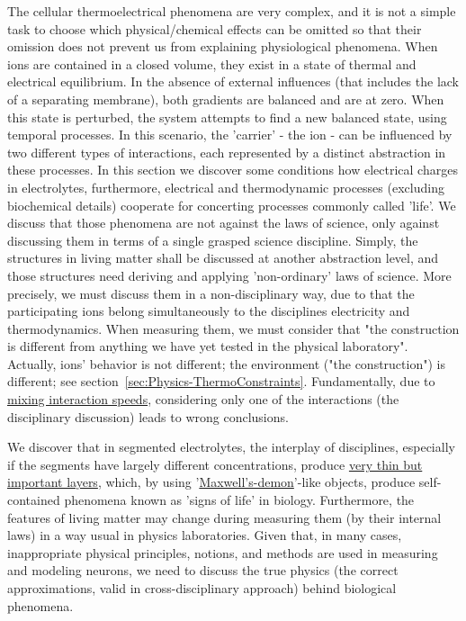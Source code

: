 	
The cellular thermoelectrical phenomena are very complex, and it is
not a simple task to choose which physical/chemical effects can be
omitted so that their omission does not prevent us from explaining
physiological phenomena. 
When ions are contained in a closed volume,
they exist in a state of thermal and electrical equilibrium.
In the absence of external influences (that includes the lack of a separating membrane),
both gradients are balanced and are at zero.
When this state is perturbed, the system attempts to find a 
new balanced state, using temporal processes.
In this scenario, the 'carrier' - the ion - can be influenced by two different types of interactions, each represented by a distinct abstraction in these processes.
In this section we  discover some conditions how electrical charges in electrolytes, furthermore, electrical and thermodynamic processes (excluding biochemical details)
cooperate for concerting processes commonly called 'life'.
We discuss that those phenomena are not against the laws of science, only against discussing them in terms of a single grasped science discipline. 
Simply, the structures in living matter shall be 
discussed at another abstraction level, and those structures  need deriving and applying 'non-ordinary' laws of science.
More precisely, we must discuss them in a non-disciplinary way, due to that the participating ions belong simultaneously to the disciplines electricity and thermodynamics.
When measuring them, we must consider that "the construction is different from anything we have yet tested in the physical laboratory".
Actually, ions' behavior is not different; the environment ("the construction") is different; see section~\ref{sec:Physics-ThermoConstraints}. 
Fundamentally, due to \hyperlink{MixingSpeeds}{mixing interaction speeds}, considering only one of the interactions (the disciplinary discussion) leads to wrong conclusions.
\else

\fi

\ifx\magyar\undefined

We discover that in segmented electrolytes, the interplay of disciplines, especially if the segments have largely different concentrations, produce \hyperlink{DynamicLayer}
{very thin but important layers}, which, by using '\hyperlink{Maxwell-demon}
{Maxwell's-demon}'-like objects, produce self-contained phenomena known as 'signs of life' in biology.
Furthermore, the features of living matter may change during measuring 
them (by their internal laws) in a way usual in physics laboratories.
Given that, in many cases, inappropriate physical principles, notions, and methods are used in
measuring and modeling neurons,
we need to discuss 
the true physics (the correct approximations, valid in cross-disciplinary approach)
behind biological phenomena.
\else

